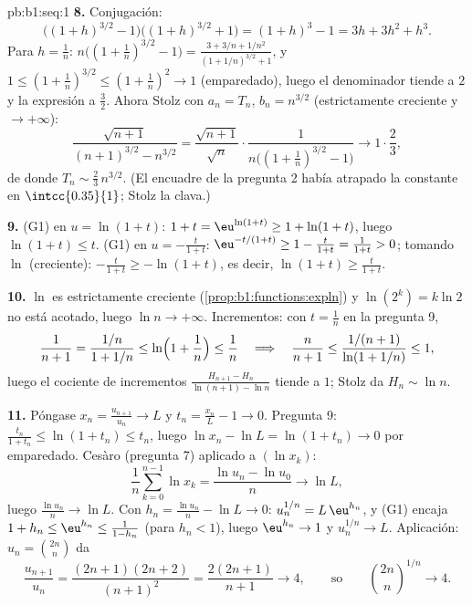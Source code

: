 \begin{solution}{pb:b1:seq:1}
\textbf{8.} Conjugación:
\[
\bigl((1+h)^{3/2} - 1\bigr)\bigl((1+h)^{3/2} + 1\bigr)
= (1+h)^3 - 1 = 3h + 3h^2 + h^3 .
\]
Para $h = \frac1n$: $n\bigl((1 + \frac1n)^{3/2} - 1\bigr) =
\frac{3 + 3/n + 1/n^2}{(1 + 1/n)^{3/2} + 1}$, y
$1 \leq (1 + \frac1n)^{3/2} \leq (1 + \frac1n)^2 \to 1$
(emparedado), luego el denominador tiende a $2$ y la expresión a
$\frac32$. Ahora Stolz con $a_n = T_n$, $b_n = n^{3/2}$
(estrictamente creciente y $\to +\infty$):
\[
\frac{\sqrt{n+1}}{(n+1)^{3/2} - n^{3/2}}
= \frac{\sqrt{n+1}}{\sqrt n} \cdot
\frac{1}{n\bigl((1 + \frac1n)^{3/2} - 1\bigr)}
\longrightarrow 1 \cdot \frac{2}{3},
\]
de donde $T_n \sim \frac23\,n^{3/2}$. (El encuadre de la pregunta 2
había atrapado la constante en $\intcc{0.35}{1}$; Stolz la clava.)

\textbf{9.} (G1) en $u = \ln(1+t)$: $1 + t = \eu^{\ln(1+t)} \geq
1 + \ln(1+t)$, luego $\ln(1+t) \leq t$. (G1) en
$u = -\frac{t}{1+t}$: $\eu^{-t/(1+t)} \geq 1 - \frac{t}{1+t} =
\frac{1}{1+t} > 0$; tomando $\ln$ (creciente):
$-\frac{t}{1+t} \geq -\ln(1+t)$, es decir, $\ln(1+t) \geq
\frac{t}{1+t}$.

\textbf{10.} $\ln$ es estrictamente creciente
(\cref{prop:b1:functions:expln}) y $\ln(2^k) = k\ln 2$ no está
acotado, luego $\ln n \to +\infty$. Incrementos: con $t = \frac1n$ en
la pregunta 9,
\[
\frac 1{n+1} = \frac{1/n}{1 + 1/n} \leq
\ln\Bigl(1 + \frac1n\Bigr) \leq \frac1n
\quad\Longrightarrow\quad
\frac{n}{n+1} \leq \frac{1/(n+1)}{\ln(1 + 1/n)} \leq 1 ,
\]
luego el cociente de incrementos
$\frac{H_{n+1} - H_n}{\ln(n+1) - \ln n}$ tiende a $1$; Stolz da
$H_n \sim \ln n$.

\textbf{11.} Póngase $x_n = \frac{u_{n+1}}{u_n} \to L$ y
$t_n = \frac{x_n}{L} - 1 \to 0$. Pregunta 9:
$\frac{t_n}{1 + t_n} \leq \ln(1 + t_n) \leq t_n$, luego
$\ln x_n - \ln L = \ln(1 + t_n) \to 0$ por emparedado. Cesàro
(pregunta 7) aplicado a $(\ln x_k)$:
\[
\frac1n \sum_{k=0}^{n-1} \ln x_k = \frac{\ln u_n - \ln u_0}{n}
\longrightarrow \ln L ,
\]
luego $\frac{\ln u_n}{n} \to \ln L$. Con
$h_n = \frac{\ln u_n}{n} - \ln L \to 0$: $u_n^{1/n} = L\,\eu^{h_n}$,
y (G1) encaja $1 + h_n \leq \eu^{h_n} \leq \frac{1}{1 - h_n}$ (para
$h_n < 1$), luego $\eu^{h_n} \to 1$ y $u_n^{1/n} \to L$. Aplicación:
$u_n = \binom{2n}{n}$ da
\[
\frac{u_{n+1}}{u_n} = \frac{(2n+1)(2n+2)}{(n+1)^2}
= \frac{2(2n+1)}{n+1} \longrightarrow 4 ,
\qquad\text{so}\qquad
\binom{2n}{n}^{1/n} \to 4 .
\]


\end{solution}
